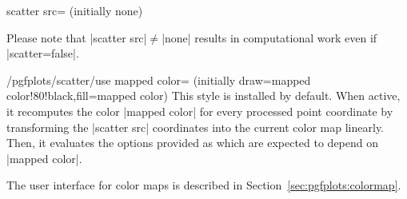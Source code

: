 {\begin{pgfplotskey}{scatter src= (initially none)%
}
\begin{codeexample}
\end{codeexample}

    Please note that |scatter src|$\neq$|none| results in computational work
    even if |scatter=false|.
\end{pgfplotskey}

\begin{stylekey}{/pgfplots/scatter/use mapped color=
    (initially draw=mapped color!80!black,fill=mapped color)%
}
    This style is installed by default. When active, it recomputes the color
    |mapped color| for every processed point coordinate by transforming the
    |scatter src| coordinates into the current color map linearly. Then, it
    evaluates the options provided as  which are
    expected to depend on |mapped color|.

    The user interface for color maps is described in
    Section~\ref{sec:pgfplots:colormap}.

\begin{codeexample}[]
\end{codeexample}


\end{stylekey}}
